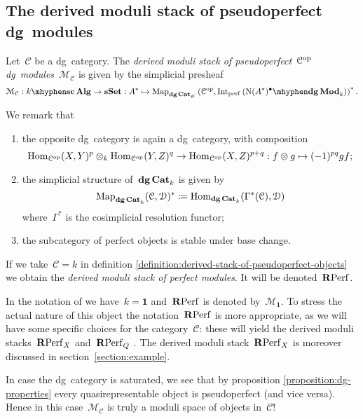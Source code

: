 \begin{refsection}
\subsection{The derived moduli stack of pseudoperfect dg~modules}
\begin{definition}
  \label{definition:derived-stack-of-pseudoperfect-objects}
  Let~$\mathcal{C}$ be a dg~category. The \emph{derived moduli stack of pseudoperfect~$\mathcal{C}^{\mathrm{op}}$\dash dg~modules}~$\mathcal{M}_{\mathcal{C}}$ is given by the simplicial presheaf
  \begin{equation}
    \mathcal{M}_{\mathcal{C}}:\scAlg{k}\to\sSet:A^*\mapsto\Map_{\dgCat_K}\left( \mathcal{C}^\opp,\Int_\perf\left( \dgMod{\nerve(A^*)^\bullet}_k \right) \right)^*.
  \end{equation}
\end{definition}

We remark that
\begin{enumerate}
  \item the opposite dg~category is again a dg~category, with composition
    \begin{equation}
      \mathrm{Hom}_{\mathcal{C}^{\mathrm{op}}}(X,Y)^p\otimes_k\mathrm{Hom}_{\mathcal{C}^{\mathrm{op}}}(Y,Z)^q\to\mathrm{Hom}_{\mathcal{C}^{\mathrm{op}}}(X,Z)^{p+q}:f\otimes g\mapsto(-1)^{pq}gf;
    \end{equation}
  \item the simplicial structure of~$\mathbf{dg\,Cat}_k$ is given by
    \begin{equation}
      \operatorname{\mathrm{Map}}_{\mathbf{dg\,Cat}_k}(\mathcal{C},\mathcal{D})^*\coloneqq\mathrm{Hom}_{\mathbf{dg\,Cat}_k}(\Gamma^*(\mathcal{C}),\mathcal{D})
    \end{equation}
    where~$\Gamma^*$ is the cosimplicial resolution functor;
  \item the subcategory of perfect objects is stable under base change.
\end{enumerate}

\begin{definition}
  If we take~$\mathcal{C}=k$ in definition \ref{definition:derived-stack-of-pseudoperfect-objects} we obtain the \emph{derived moduli stack of perfect modules}. It will be denoted~$\mathbf{R}\mathrm{Perf}$.
\end{definition}

In the notation of \cite{toen-vaquie} we have~$k=\mathbf{1}$ and~$\mathbf{R}\mathrm{Perf}$ is denoted by~$\mathcal{M}_{\mathbf{1}}$. To stress the actual nature of this object the notation~$\mathbf{R}\mathrm{Perf}$ is more appropriate, as we will have some specific choices for the category~$\mathcal{C}$: these will yield the derived moduli stacks~$\mathbf{R}\mathrm{Perf}_X$ and~$\mathbf{R}\mathrm{Perf}_Q$ \cite[section 3.5]{toen-vaquie}. The derived moduli stack~$\mathbf{R}\mathrm{Perf}_X$ is moreover discussed in section~\ref{section:example}.
\begin{remark}
  \label{remark:saturated}
  In case the dg~category is saturated, we see that by proposition \ref{proposition:dg-properties} every quasirepresentable object is pseudoperfect (and vice versa). Hence in this case~$\mathcal{M}_{\mathcal{C}}$ is truly a moduli space of objects in~$\mathcal{C}$!
\end{remark}


\end{refsection}
